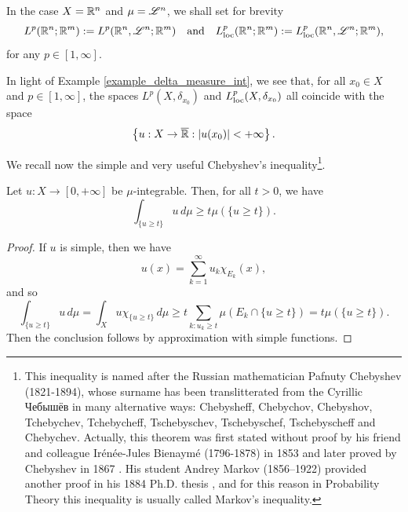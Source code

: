 In the case $X = \mathbb{R}^{n}$ and $\mu = \mathscr{L}^{n}$, we shall set for brevity 
\begin{equation*}
L^{p}(\mathbb{R}^{n}; \mathbb{R}^{m}) := L^{p}(\mathbb{R}^{n}, \mathscr{L}^{n}; \mathbb{R}^{m}) \quad \text{and} \quad L^{p}_{\rm loc}(\mathbb{R}^{n}; \mathbb{R}^{m}) := L^{p}_{\rm loc}(\mathbb{R}^{n}, \mathscr{L}^{n}; \mathbb{R}^{m}),
\end{equation*} 
for any $p \in [1, \infty]$.

\begin{example}
In light of Example \ref{example_delta_measure_int}, we see that, for all $x_{0} \in X$ and $p \in [1, \infty]$, the spaces $L^{p}(X, \delta_{x_{0}})$ and $L^{p}_{\rm loc}(X, \delta_{x_{0}})$ all coincide with the space
\begin{equation*}
\left \{ u : X \to \overline{\mathbb{R}} : |u(x_{0})| < + \infty \right \}.
\end{equation*}
\end{example}

We recall now the simple and very useful Chebyshev's inequality\footnote{This inequality is named after the Russian mathematician Pafnuty Chebyshev (1821-1894), whose surname has been translitterated from the Cyrillic Чебышёв in many alternative ways: Chebysheff, Chebychov, Chebyshov, Tchebychev, Tchebycheff, Tschebyschev, Tschebyschef, Tschebyscheff and Chebychev. Actually, this theorem was first stated without proof by his friend and colleague Irénée-Jules Bienaymé (1796-1878) in 1853 \cite{bienayme1853considerations} and later proved by Chebyshev in 1867 \cite{chebyshev1867valeurs}. His student Andrey Markov (1856–1922) provided another proof in his 1884 Ph.D. thesis \cite{markov1884certain}, and for this reason in Probability Theory this inequality is usually called Markov's inequality.}.

\begin{proposition} \label{prop:Cheb_ineq}
Let $u : X \to [0, + \infty]$ be $\mu$-integrable. Then, for all $t > 0$, we have
\begin{equation} \label{eq:Cheb_ineq}
\int_{\{u \ge t\}} u \, d \mu \ge t \mu(\{ u \ge t \}).
\end{equation}
\end{proposition}
\begin{proof}
If $u$ is simple, then we have
\begin{equation*}
u(x) = \sum_{k = 1}^{\infty} u_{k} \chi_{E_{k}}(x),
\end{equation*}
and so
\begin{equation*}
\int_{\{u \ge t\}} u \, d \mu = \int_{X} u \chi_{\{u \ge t\}} \, d \mu \ge t \sum_{k : u_{k} \ge t} \mu(E_{k} \cap \{ u \ge t \}) = t \mu(\{ u \ge t \}).
\end{equation*}
Then the conclusion follows by approximation with simple functions.
\end{proof}

